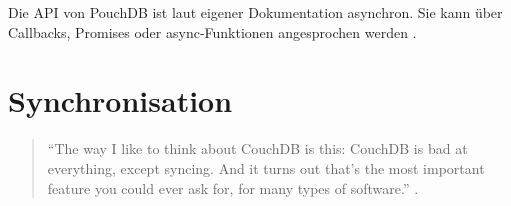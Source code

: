 Die API von PouchDB ist laut eigener Dokumentation asynchron. Sie kann über Callbacks, Promises oder async-Funktionen angesprochen werden \cite{pouch:api}.


\section{Synchronisation}
\label{Synchronisation}

\begin{citeenv}
	\begin{quotation}
		"`The way I like to think about CouchDB is this: CouchDB is bad at everything, except syncing. And it turns out that's the most important feature you could ever ask for, for many types of software."' \cite{pouch:replication}.
	\end{quotation}
\end{citeenv}